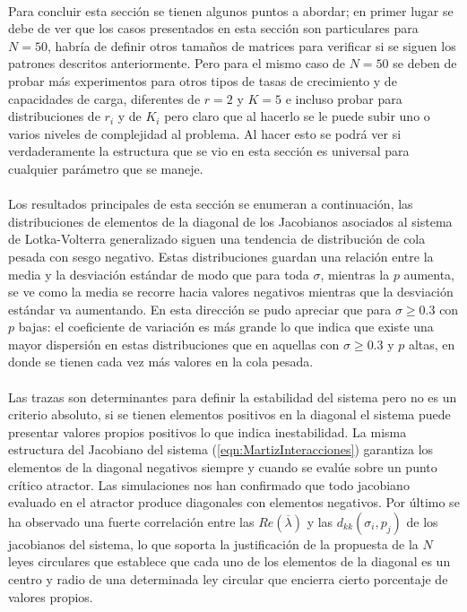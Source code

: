\\
Para concluir esta sección se tienen algunos puntos a abordar; en primer lugar se debe de ver que los casos presentados en esta sección son particulares para $N=50$, habría de definir otros tamaños de matrices para verificar si se siguen los patrones descritos anteriormente. Pero para el mismo caso de $N=50$ se deben de probar más experimentos para otros tipos de tasas de crecimiento y de capacidades de carga, diferentes de $r=2$ y $K=5$ e incluso probar para distribuciones de $r_i$ y de $K_i$ pero claro que al hacerlo se le puede subir uno o varios niveles de complejidad al problema. Al hacer esto se podrá ver si verdaderamente la estructura que se vio en esta sección es universal para cualquier parámetro que se maneje.\\
\\
Los resultados principales de esta sección se enumeran a continuación, las distribuciones de elementos de la diagonal de los Jacobianos asociados al sistema de Lotka-Volterra generalizado siguen una tendencia de distribución de cola pesada con sesgo negativo. Estas distribuciones guardan una relación entre la media y la desviación estándar de modo que para toda $\sigma$, mientras la $p$ aumenta, se ve como la media se recorre hacia valores negativos mientras que la desviación estándar va aumentando. En esta dirección se pudo apreciar que para $\sigma\geq 0.3$ con $p$ bajas: el coeficiente de variación es más grande lo que indica que existe una mayor dispersión en estas distribuciones que en aquellas con $\sigma\geq 0.3$ y $p$ altas, en donde se tienen cada vez más valores en la cola pesada.\\
\\
Las trazas son determinantes para definir la estabilidad del sistema pero no es un criterio absoluto, si se tienen elementos positivos en la diagonal el sistema puede presentar valores propios positivos lo que indica inestabilidad. La misma estructura del Jacobiano del sistema (\ref{eqn:MartizInteracciones}) garantiza los elementos de la diagonal negativos siempre y cuando se evalúe sobre un punto crítico atractor. Las simulaciones nos han confirmado que todo jacobiano evaluado en el atractor produce diagonales con elementos negativos. Por último se ha observado una fuerte correlación entre las $Re(\overline{\lambda})$ y las $d_{kk}(\sigma_i,p_j)$ de los jacobianos del sistema, lo que soporta la justificación de la propuesta de la $N$ leyes circulares que establece que cada uno de los elementos de la diagonal es un centro y radio de una determinada ley circular que encierra cierto porcentaje de valores propios. \\
